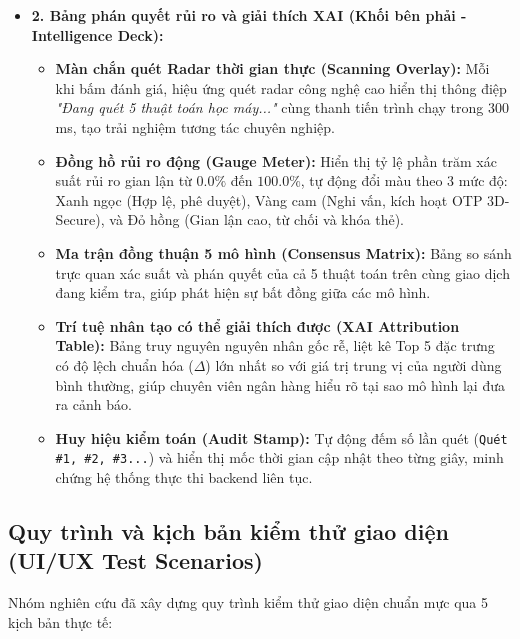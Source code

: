\documentclass[13pt,a4paper]{extarticle}
\begin{document}
\begin{itemize}
    \item \textbf{2. Bảng phán quyết rủi ro và giải thích XAI (Khối bên phải - Intelligence Deck):}
    \begin{itemize}
        \item \textbf{Màn chắn quét Radar thời gian thực (Scanning Overlay):} Mỗi khi bấm đánh giá, hiệu ứng quét radar công nghệ cao hiển thị thông điệp \textit{"Đang quét 5 thuật toán học máy..."} cùng thanh tiến trình chạy trong $300$ms, tạo trải nghiệm tương tác chuyên nghiệp.
        \item \textbf{Đồng hồ rủi ro động (Gauge Meter):} Hiển thị tỷ lệ phần trăm xác suất rủi ro gian lận từ $0.0\%$ đến $100.0\%$, tự động đổi màu theo 3 mức độ: Xanh ngọc (Hợp lệ, phê duyệt), Vàng cam (Nghi vấn, kích hoạt OTP 3D-Secure), và Đỏ hồng (Gian lận cao, từ chối và khóa thẻ).
        \item \textbf{Ma trận đồng thuận 5 mô hình (Consensus Matrix):} Bảng so sánh trực quan xác suất và phán quyết của cả 5 thuật toán trên cùng giao dịch đang kiểm tra, giúp phát hiện sự bất đồng giữa các mô hình.
        \item \textbf{Trí tuệ nhân tạo có thể giải thích được (XAI Attribution Table):} Bảng truy nguyên nguyên nhân gốc rễ, liệt kê Top 5 đặc trưng có độ lệch chuẩn hóa ($\Delta$) lớn nhất so với giá trị trung vị của người dùng bình thường, giúp chuyên viên ngân hàng hiểu rõ tại sao mô hình lại đưa ra cảnh báo.
        \item \textbf{Huy hiệu kiểm toán (Audit Stamp):} Tự động đếm số lần quét (\texttt{Quét \#1, \#2, \#3...}) và hiển thị mốc thời gian cập nhật theo từng giây, minh chứng hệ thống thực thi backend liên tục.
    \end{itemize}
\end{itemize}

\subsection{Quy trình và kịch bản kiểm thử giao diện (UI/UX Test Scenarios)}
Nhóm nghiên cứu đã xây dựng quy trình kiểm thử giao diện chuẩn mực qua 5 kịch bản thực tế:
\end{document}
